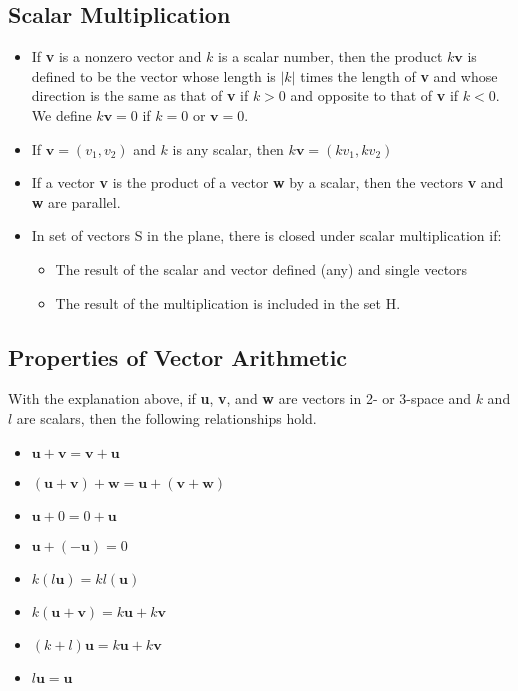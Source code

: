 \documentclass[a4paper,12pt]{article}
\begin{document}
\subsection*{Scalar Multiplication}
\begin{itemize}
  \item If \textbf{v} is a nonzero vector and \(k\) is a scalar number, then the product \(k\textbf{v}\) is defined to be the vector whose length is \(|k|\) times the length of \textbf{v} and whose direction is the same as that of \textbf{v} if \(k>0\) and opposite to that of \textbf{v} if \(k<0\). We define \(k\textbf{v}=0\) if \(k=0\) or \(\textbf{v}=0\).
  \item If \(\textbf{v}=(v_1, v_2)\) and \(k\) is any scalar, then \(k\textbf{v}=(kv_1, kv_2)\)
  \item If a vector \textbf{v} is the product of a vector \textbf{w} by a scalar, then the vectors \textbf{v} and \textbf{w} are parallel.
  \item In set of vectors S in the plane, there is closed under scalar multiplication if: \begin{itemize}
          \item The result of the scalar and vector defined (any) and single vectors
          \item The result of the multiplication is included in the set H.
        \end{itemize}
\end{itemize}

\subsection*{Properties of Vector Arithmetic}
With the explanation above, if \textbf{u}, \textbf{v}, and \textbf{w} are vectors in 2- or 3-space and \(k\) and \(l\) are scalars, then the following relationships hold.
\begin{itemize}
  \item \(\textbf{u}+\textbf{v}=\textbf{v}+\textbf{u}\)
  \item \((\textbf{u}+\textbf{v})+\textbf{w}=\textbf{u}+(\textbf{v}+\textbf{w})\)
  \item \(\textbf{u}+0=0+\textbf{u}\)
  \item \(\textbf{u}+(-\textbf{u})=0\)
  \item \(k(l\textbf{u})=kl(\textbf{u})\)
  \item \(k(\textbf{u}+\textbf{v})=k\textbf{u}+k\textbf{v}\)
  \item \((k+l)\textbf{u}=k\textbf{u}+k\textbf{v}\)
  \item \(l\textbf{u}=\textbf{u}\)
\end{itemize}
\end{document}
